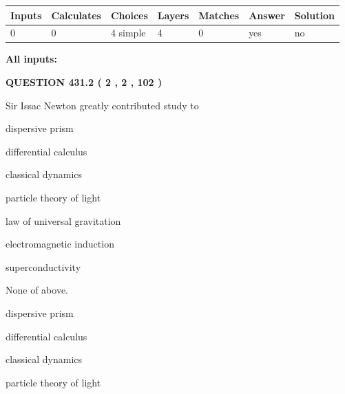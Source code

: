 \documentclass[12pt]{article}
\begin{document}
 
   
   
   
   
\noindent\begin{tabular}{|l|l|l|l|l|l|l|}
 \hline
Inputs & Calculates & Choices & Layers & Matches & Answer & Solution \\ \hline
 0  & 
 0  & 
 4
  simple  
  & 
 4  & 
 0  & 
  yes & 
  no 
  \\ \hline
 \end{tabular}
   
   
   
   
\noindent{}
   
   
   
   
\noindent\vspace{0.1in}\hspace{-0.08in} {\textbf{\Large{All inputs: }}}
   
   
  
\vspace{0.2in}
  
{\textbf{\Large{QUESTION
431.2 
 ( 2 , 2 , 102 )
}}}
  
  
Sir Issac Newton greatly contributed study to
 
 
dispersive prism
 
 
differential calculus
 
 
classical dynamics
 
 
particle theory of light
 
 
law of universal gravitation
 
 
electromagnetic induction
 
 
superconductivity
 
 
 None of above.
 
 
\noindent{}
 
 
dispersive prism
 
 
differential calculus
 
 
classical dynamics
 
 
particle theory of light
 
\end{document}
